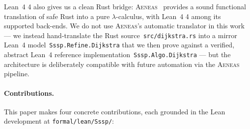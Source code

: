 \documentclass[11pt,a4paper]{article}
\newcommand{\Lean}{Lean~4\xspace}
\newcommand{\code}[1]{\texttt{#1}}
\theoremstyle{plain}
\theoremstyle{definition}
\begin{document}
\Lean{} 4 also gives us a clean Rust bridge:
\textsc{Aeneas}~\cite{HoProtzenko2022Aeneas,HoFromherzProtzenko2024Aeneas}
provides a sound functional translation of safe Rust into a pure
$\lambda$-calculus, with \Lean{} 4 among its supported back-ends. We do not
use \textsc{Aeneas}'s automatic translator in this work --- we instead
hand-translate the Rust source~\code{src/dijkstra.rs} into a mirror
\Lean{} model~\code{Sssp.Refine.Dijkstra} that we then prove against a
verified, abstract \Lean{} reference implementation~\code{Sssp.Algo.Dijkstra}
--- but the architecture is deliberately compatible with future automation
via the \textsc{Aeneas} pipeline.

\paragraph*{Contributions.}
This paper makes four concrete contributions, each grounded in the Lean
development at \code{formal/lean/Sssp/}:
\end{document}
